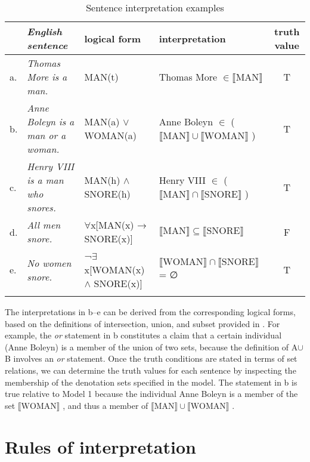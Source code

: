 \begin{table}
\scriptsize
\caption{Sentence interpretation examples}
\label{extab:13.21} 
\begin{tabularx}{\textwidth}{l@{~} >{\itshape}Q@{}l@{~}l@{}c}
\lsptoprule
 & \textup{English sentence} &  logical form &  interpretation &  truth value\\
\midrule
a. &  Thomas More is a man. &  MAN(t) & Thomas More ${\in} \llbracket\text{MAN}\rrbracket$  &   T \\
\tablevspace
b. &  Anne Boleyn is a man or a woman. &  MAN(a) $\vee$ WOMAN(a)  &  Anne Boleyn ${\in}$ ($\llbracket\text{MAN}\rrbracket {\cup} \llbracket\text{WOMAN}\rrbracket$ ) & T\\
\tablevspace
c. &   {Henry VIII is a man who snores}. & MAN(h) $\wedge$ SNORE(h) & Henry VIII ${\in}$ ($\llbracket\text{MAN}\rrbracket {\cap} \llbracket\text{SNORE}\rrbracket$ ) & T\\
\tablevspace
d. & {All men snore}.& ${\forall}$x[MAN(x) → SNORE(x)] & $\llbracket\text{MAN}\rrbracket {\subseteq} \llbracket\text{SNORE}\rrbracket$  & F\\
\tablevspace
e. &   {No women snore.} &  ¬${\exists}$x[WOMAN(x) $\wedge$ SNORE(x)]\hspace{2mm} & $\llbracket\text{WOMAN}\rrbracket {\cap} \llbracket\text{SNORE}\rrbracket$  = ∅ & T\\
\lspbottomrule
\end{tabularx} 
\end{table}

The interpretations in b--e can be derived from the corresponding logical forms, based on the definitions of intersection, union, and subset provided in . For example, the \textit{or} statement in b constitutes a claim that a certain individual (Anne Boleyn) is a member of the union of two sets, because the definition of A${\cup}$B involves an \textit{or} statement. Once the truth conditions are stated in terms of set relations, we can determine the truth values for each sentence by inspecting the membership of the denotation sets specified in the model. The statement in b is true relative to Model 1 because the individual Anne Boleyn is a member of the set $\llbracket\text{WOMAN}\rrbracket$ , and thus a member of $\llbracket\text{MAN}\rrbracket {\cup} \llbracket\text{WOMAN}\rrbracket$ .


\section{Rules of interpretation}\label{sec:13.5}

